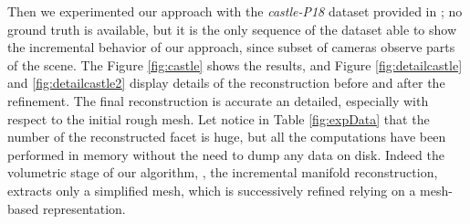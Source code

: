Then we experimented our approach with the \emph{castle-P18} dataset provided in \cite{strecha2008}; no ground truth is available, but it is the only sequence of the dataset able to show the incremental behavior of our approach, since subset of cameras observe parts of the scene. 
The Figure \ref{fig:castle} shows the results, and Figure \ref{fig:detailcastle} and \ref{fig:detailcastle2} display details of the reconstruction before and after the refinement. The final reconstruction is accurate  an detailed, especially with respect to the initial rough mesh.
Let notice in Table \ref{fig:expData} that the number of the reconstructed facet is huge, but all the computations have been performed in memory without the need to dump any data on disk. Indeed the volumetric stage of our algorithm, \ie, the incremental manifold reconstruction, extracts only a  simplified mesh, which is successively refined relying on a mesh-based representation.



